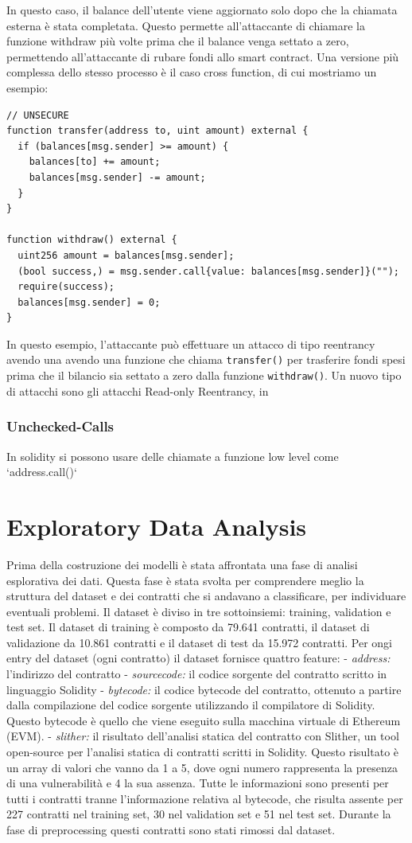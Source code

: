\documentclass[../../Thesis.tex]{subfiles}
\begin{document}
In questo caso, il balance dell'utente viene aggiornato solo dopo che la chiamata esterna è stata completata. Questo permette all'attaccante di chiamare la funzione withdraw più volte prima che il balance venga settato a zero, permettendo all'attaccante di rubare fondi allo smart contract.
Una versione più complessa dello stesso processo è il caso cross function, di cui mostriamo un esempio:
\begin{lstlisting}[language=Solidity]
    // UNSECURE
function transfer(address to, uint amount) external {
  if (balances[msg.sender] >= amount) {
    balances[to] += amount;
    balances[msg.sender] -= amount;
  }
}

function withdraw() external {
  uint256 amount = balances[msg.sender];
  (bool success,) = msg.sender.call{value: balances[msg.sender]}("");
  require(success);
  balances[msg.sender] = 0;
}
\end{lstlisting}
In questo esempio, l'attaccante può effettuare un attacco di tipo reentrancy avendo una avendo una funzione che chiama \texttt{transfer()} per trasferire fondi spesi prima che il bilancio sia settato a zero dalla funzione \texttt{withdraw()}.
Un nuovo tipo di attacchi sono gli attacchi Read-only Reentrancy, in 
\subsubsection{Unchecked-Calls}
In solidity si possono usare delle chiamate a funzione low level come `address.call()`



\section{Exploratory Data Analysis}
Prima della costruzione dei modelli è stata affrontata una fase di analisi esplorativa dei dati. Questa fase è stata svolta per comprendere meglio la struttura del dataset e dei contratti che si andavano a classificare, per individuare eventuali problemi. 
Il dataset è diviso in tre sottoinsiemi: training, validation e test set.
Il dataset di training è composto da 79.641 contratti, il dataset di validazione da 10.861 contratti e il dataset di test da 15.972 contratti.
Per ongi entry del dataset (ogni contratto) il dataset fornisce quattro feature:
- \emph{address:} l'indirizzo del contratto 
- \emph{sourcecode:} il codice sorgente del contratto scritto in linguaggio Solidity
- \emph{bytecode:} il codice bytecode del contratto, ottenuto a partire dalla compilazione del codice sorgente utilizzando il compilatore di Solidity. Questo bytecode è quello che viene eseguito sulla macchina virtuale di Ethereum (EVM). 
- \emph{slither:} il risultato dell'analisi statica del contratto con Slither, un tool open-source per l'analisi statica di contratti scritti in Solidity. Questo risultato è un array di valori che vanno da 1 a 5, dove ogni numero  rappresenta la presenza di una vulnerabilità e 4 la sua assenza.
Tutte le informazioni sono presenti per tutti i contratti tranne l'informazione relativa al bytecode, che risulta assente per 227 contratti nel training set, 30 nel validation set e 51 nel test set. Durante la fase di preprocessing questi contratti sono stati rimossi dal dataset. 
 
\end{document}
